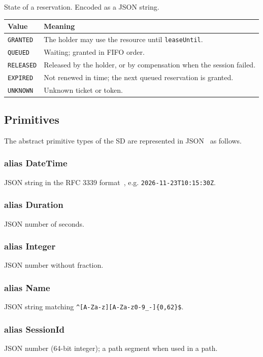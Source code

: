 \documentclass[a4paper]{arrowhead}
\newcommand{\pdef}[1]{{\textcolor{ArrowheadGrey}{#1\label{sec:model:primitives:#1}\label{sec:model:primitives:#1s}}}}
\begin{document}
State of a reservation.
 Encoded as a JSON string.
{\small
\begin{longtable}{|p{3.9cm}|p{11.9cm}|}

\hline
\rowcolor{gray!33} Value & Meaning \\ \hline
\endhead
\texttt{GRANTED} & The holder may use the resource until \texttt{leaseUntil}. \\ \hline
\texttt{QUEUED} & Waiting; granted in FIFO order. \\ \hline
\texttt{RELEASED} & Released by the holder, or by compensation when the session failed. \\ \hline
\texttt{EXPIRED} & Not renewed in time; the next queued reservation is granted. \\ \hline
\texttt{UNKNOWN} & Unknown ticket or token. \\ \hline
\end{longtable}
}


\subsection{Primitives}
\label{sec:model:primitives}
The abstract primitive types of the SD are represented in JSON~\cite{rfc8259} as follows.
\subsubsection*{alias \pdef{DateTime}}
JSON string in the RFC 3339 format~\cite{rfc3339}, e.g. \texttt{2026-11-23T10:15:30Z}.

\subsubsection*{alias \pdef{Duration}}
JSON number of seconds.

\subsubsection*{alias \pdef{Integer}}
JSON number without fraction.

\subsubsection*{alias \pdef{Name}}
JSON string matching \texttt{\^{}[A-Za-z][A-Za-z0-9\_-]\{0,62\}\$}.

\subsubsection*{alias \pdef{SessionId}}
JSON number (64-bit integer); a path segment when used in a path.
\end{document}
